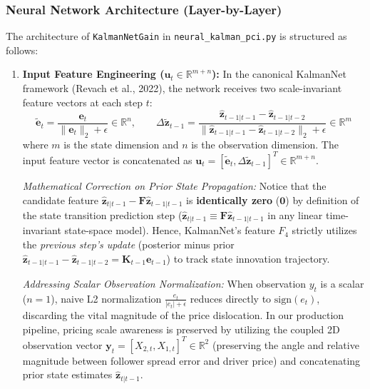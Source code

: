 \documentclass[11pt, a4paper]{article}
\begin{document}
\subsubsection{Neural Network Architecture (Layer-by-Layer)}
The architecture of \texttt{KalmanNetGain} in \texttt{neural\_kalman\_pci.py} is structured as follows:

\begin{enumerate}
    \item \textbf{Input Feature Engineering ($\mathbf{u}_t \in \mathbb{R}^{m+n}$):}  
    In the canonical KalmanNet framework (Revach et al., 2022), the network receives two scale-invariant feature vectors at each step $t$:
    \begin{equation}
        \tilde{\mathbf{e}}_t = \frac{\mathbf{e}_t}{\|\mathbf{e}_t\|_2 + \epsilon} \in \mathbb{R}^n, \qquad \Delta \tilde{\mathbf{z}}_{t-1} = \frac{\hat{\mathbf{z}}_{t-1|t-1} - \hat{\mathbf{z}}_{t-1|t-2}}{\|\hat{\mathbf{z}}_{t-1|t-1} - \hat{\mathbf{z}}_{t-1|t-2}\|_2 + \epsilon} \in \mathbb{R}^m
    \end{equation}
    where $m$ is the state dimension and $n$ is the observation dimension. The input feature vector is concatenated as $\mathbf{u}_t = [\tilde{\mathbf{e}}_t, \Delta \tilde{\mathbf{z}}_{t-1}]^T \in \mathbb{R}^{m+n}$. 

    \textit{Mathematical Correction on Prior State Propagation:} Notice that the candidate feature $\hat{\mathbf{z}}_{t|t-1} - \mathbf{F}\hat{\mathbf{z}}_{t-1|t-1}$ is \textbf{identically zero} ($\mathbf{0}$) by definition of the state transition prediction step ($\hat{\mathbf{z}}_{t|t-1} \equiv \mathbf{F}\hat{\mathbf{z}}_{t-1|t-1}$ in any linear time-invariant state-space model). Hence, KalmanNet's feature $F_4$ strictly utilizes the \textit{previous step's update} (posterior minus prior $\hat{\mathbf{z}}_{t-1|t-1} - \hat{\mathbf{z}}_{t-1|t-2} = \mathbf{K}_{t-1}\mathbf{e}_{t-1}$) to track state innovation trajectory.

    \textit{Addressing Scalar Observation Normalization:} When observation $y_t$ is a scalar ($n=1$), naive L2 normalization $\frac{e_t}{|e_t| + \epsilon}$ reduces directly to $\text{sign}(e_t)$, discarding the vital magnitude of the price dislocation. In our production pipeline, pricing scale awareness is preserved by utilizing the coupled 2D observation vector $\mathbf{y}_t = [X_{2,t}, X_{1,t}]^T \in \mathbb{R}^2$ (preserving the angle and relative magnitude between follower spread error and driver price) and concatenating prior state estimates $\hat{\mathbf{z}}_{t|t-1}$.
    

\end{enumerate}
\end{document}

